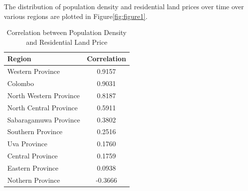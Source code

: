 \documentclass[conference]{IEEEtran}
\begin{document}
The distribution of population density and residential land prices over time over various regions are plotted in Figure\ref{fig:figure1}. 

\begin{table}[h]
\caption{Correlation between Population Density and Residential Land Price}
\label{table_1}
\begin{center}
\begin{tabular}{|l|c|}
\hline
\textbf{Region} & \textbf{Correlation}\\
\hline
Western Province & 0.9157\\
\hline
Colombo & 0.9031\\
\hline
North Western Province & 0.8187\\
\hline
North Central Province & 0.5911\\
\hline
Sabaragamuwa Province & 0.3802\\
\hline
Southern Province & 0.2516\\
\hline
Uva Province & 0.1760\\
\hline
Central Province & 0.1759\\
\hline
Eastern Province & 0.0938\\
\hline
Nothern Province & -0.3666\\
\hline
\end{tabular}
\end{center}
\end{table}

\end{document}
